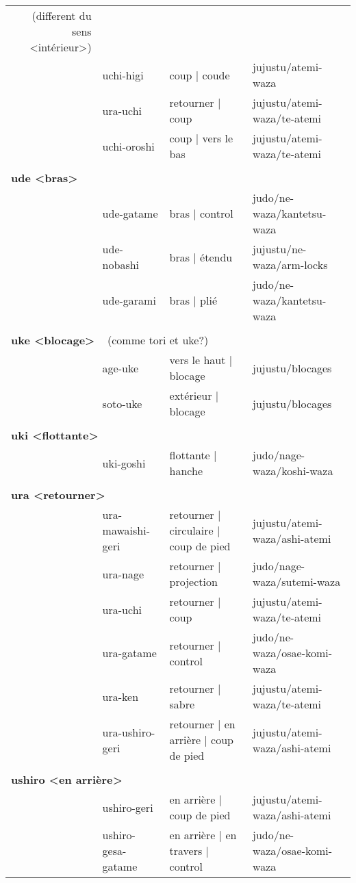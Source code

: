 \documentclass{article}%
\begin{document}
\begin{longtable}{rlll}
{~%
(different du sens <intérieur>)}&\\%
&uchi{-}higi&coup | coude&jujustu/atemi{-}waza\\%
&ura{-}uchi&retourner | coup&jujustu/atemi{-}waza/te{-}atemi\\%
&uchi{-}oroshi&coup | vers le bas&jujustu/atemi{-}waza/te{-}atemi\\%
&&&\\%
\multicolumn{3}{l}{\textbf{ude <bras>}%
~%
}&\\%
&ude{-}gatame&bras | control&judo/ne{-}waza/kantetsu{-}waza\\%
&ude{-}nobashi&bras | étendu&jujustu/ne{-}waza/arm{-}locks\\%
&ude{-}garami&bras | plié&judo/ne{-}waza/kantetsu{-}waza\\%
&&&\\%
\multicolumn{3}{l}{\textbf{uke <blocage>}%
~%
(comme tori et uke?)}&\\%
&age{-}uke&vers le haut | blocage&jujustu/blocages\\%
&soto{-}uke&extérieur | blocage&jujustu/blocages\\%
&&&\\%
\multicolumn{3}{l}{\textbf{uki <flottante>}%
~%
}&\\%
&uki{-}goshi&flottante | hanche&judo/nage{-}waza/koshi{-}waza\\%
&&&\\%
\multicolumn{3}{l}{\textbf{ura <retourner>}%
~%
}&\\%
&ura{-}mawaishi{-}geri&retourner | circulaire | coup de pied&jujustu/atemi{-}waza/ashi{-}atemi\\%
&ura{-}nage&retourner | projection&judo/nage{-}waza/sutemi{-}waza\\%
&ura{-}uchi&retourner | coup&jujustu/atemi{-}waza/te{-}atemi\\%
&ura{-}gatame&retourner | control&judo/ne{-}waza/osae{-}komi{-}waza\\%
&ura{-}ken&retourner | sabre&jujustu/atemi{-}waza/te{-}atemi\\%
&ura{-}ushiro{-}geri&retourner | en arrière | coup de pied&jujustu/atemi{-}waza/ashi{-}atemi\\%
&&&\\%
\multicolumn{3}{l}{\textbf{ushiro <en arrière>}%
~%
}&\\%
&ushiro{-}geri&en arrière | coup de pied&jujustu/atemi{-}waza/ashi{-}atemi\\%
&ushiro{-}gesa{-}gatame&en arrière | en travers | control&judo/ne{-}waza/osae{-}komi{-}waza\\%

\end{longtable}
\end{document}
